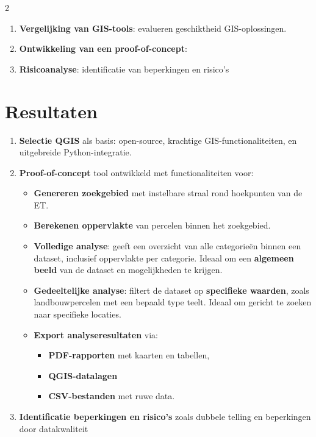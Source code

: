 \documentclass[a0,portrait]{hogent-poster}
\begin{document}
\begin{multicols}{2}
\begin{enumerate}
    \item \textcolor{hogent-grey}{\textbf{Vergelijking van GIS-tools}}: evalueren geschiktheid GIS-oplossingen.
    
    \item \textcolor{hogent-yellow}{\textbf{Ontwikkeling van een proof-of-concept}}:
    
    \item \textcolor{hogent-orange}{\textbf{Risicoanalyse}}: identificatie van beperkingen en risico's
\end{enumerate}


\section{Resultaten}


\begin{enumerate}
    \item \textbf{Selectie QGIS} als basis: open-source, krachtige GIS-functionaliteiten, en uitgebreide Python-integratie.
    \item \textbf{Proof-of-concept} tool ontwikkeld met functionaliteiten voor:
    \begin{itemize}
        \item \textbf{Genereren zoekgebied} met instelbare straal rond hoekpunten van de ET.\@
        \item \textbf{Berekenen oppervlakte} van percelen binnen het zoekgebied.
         \item \textbf{Volledige analyse}: geeft een overzicht van alle categorieën binnen een dataset, inclusief oppervlakte per categorie. Ideaal om een \textbf{algemeen beeld} van de dataset en mogelijkheden te krijgen.
        \item \textbf{Gedeeltelijke analyse}: filtert de dataset op \textbf{specifieke waarden}, zoals landbouwpercelen met een bepaald type teelt. Ideaal om gericht te zoeken naar specifieke locaties.
        \item \textbf{Export analyseresultaten} via:
            \begin{itemize}
                \item \textbf{PDF-rapporten} met kaarten en tabellen, 
                \item \textbf{QGIS-datalagen} 
                \item \textbf{CSV-bestanden} met ruwe data.
            \end{itemize}
    \end{itemize}
    \item \textbf{Identificatie beperkingen en risico's} zoals dubbele telling en beperkingen door datakwaliteit


\end{enumerate}
\end{multicols}
\end{document}
